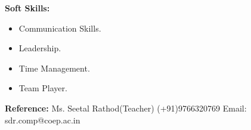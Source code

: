 \documentclass[a4paper,11pt]{article}
\begin{document}
\begin{minipage}[t]{0.4\textwidth}
			\raggedright\smallskip
			\begin{LARGE}
				 \textbf{Soft Skills:}\medskip%
				{\small
					\begin{itemize}
						\item {Communication Skills.}
						\item {Leadership.}
						\item {Time Management.}
						\item {Team Player.}
					\end{itemize}
				}
				\begin{Large}
				\vspace{0.4cm}
				\textbf{Reference:}\medskip\linebreak%
				{\small Ms. Seetal Rathod(Teacher) \linebreak%
				(+91)9766320769\linebreak%
				Email: sdr.comp@coep.ac.in
				}
				\end{Large}
			\end{LARGE}
			\vspace{0.5cm}	

\end{minipage}%
\hspace{0.6cm}
\end{document}

